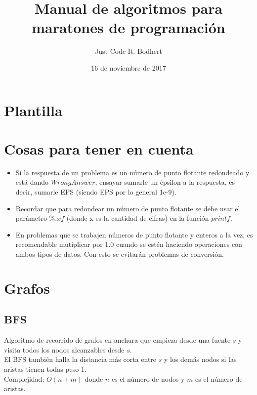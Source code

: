 \documentclass[10pt,letterpaper,twocolumn]{article}
\newcommand{\source}[1]{
  
  \dotfill
}
\begin{document}
\title{Manual de algoritmos para maratones de programación}
\author{Just Code It. Bodhert}
\date{16 de noviembre de 2017}
\maketitle

\tableofcontents

\section{Plantilla}
  \source{./src/template.cpp}

 \section{Cosas para tener en cuenta}
  \begin{itemize}
    \item Si la respuesta de un problema es un número de punto flotante redondeado y está dando $Wrong Answer$, ensayar
             sumarle un épsilon a la respuesta, es decir, sumarle EPS (siendo EPS por lo general 1e-9).
    \item Recordar que para redondear un número de punto flotante se debe usar el parámetro $\%.xf$ (donde x es la cantidad de cifras)
             en la función $printf$.
    \item En problemas que se trabajen números de punto flotante y enteros a la vez, es recomendable mutiplicar por 1.0 cuando
             se estén haciendo operaciones con ambos tipos de datos. Con esto se evitarán problemas de conversión.
  \end{itemize}

\section{Grafos}

  \subsection{BFS}
    Algoritmo de recorrido de grafos en anchura que empieza desde una fuente $s$ y visita todos los nodos alcanzables desde $s$.\\
    El BFS también halla la distancia más corta entre $s$ y los demás nodos si las aristas tienen todas peso 1.\\
    Complejidad: $O(n+m)$ donde $n$ es el número de nodos y $m$ es el número de aristas.\\
    \source{./src/bfs.cpp}
\end{document}
